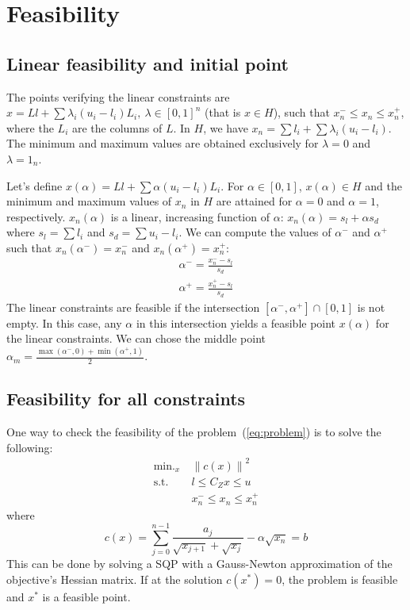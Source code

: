 \documentclass[]{article}
\DeclareMathOperator*{\minimize}{\min.}
\newcommand{\st}{\mbox{s.t.}}
\begin{document}
\section{Feasibility}
\subsection{Linear feasibility and initial point}
The points verifying the linear constraints are $x = Ll + \sum \lambda_i (u_i-l_i) L_i, \ \lambda \in \left[0,1\right]^n$ (that is $x \in H$), such that $x_n^- \leq x_n \leq x_n^+$, where the $L_i$ are the columns of $L$.\newline
In $H$, we have $x_n = \sum l_i + \sum \lambda_i (u_i-l_i)$. The minimum and maximum values are obtained exclusively for $\lambda = 0$ and $\lambda = 1_n$.

Let's define $x(\alpha) = Ll + \sum \alpha (u_i-l_i) L_i$. For $\alpha \in \left[0,1\right]$, $x(\alpha) \in H$ and the minimum and maximum values of $x_n$ in $H$ are attained for $\alpha = 0$ and $\alpha = 1$, respectively. $x_n(\alpha)$ is a linear, increasing function of $\alpha$: $x_n(\alpha) = s_l + \alpha s_d$ where $s_l = \sum l_i$ and $s_d = \sum u_i-l_i$. \newline
We can compute the values of $\alpha^-$ and $\alpha^+$ such that $x_n(\alpha^-) = x_n^-$ and $x_n(\alpha^+) = x_n^+$:
\begin{align}
 \alpha^- = \frac{x_n^- - s_l}{s_d} \\
 \alpha^+ = \frac{x_n^+ - s_l}{s_d}
\end{align}
The linear constraints are feasible if the intersection $\left[\alpha^-, \alpha^+\right] \cap \left[0,1\right]$ is not empty. In this case, any $\alpha$ in this intersection yields a feasible point $x(\alpha)$ for the linear constraints. We can chose the middle point $\alpha_m = \frac{\max(\alpha^-,0) + \min(\alpha^+,1)}{2}$.

\subsection{Feasibility for all constraints}
One way to check the feasibility of the problem~(\ref{eq:problem}) is to solve the following:
\begin{align}
  \minimize_x\ & \left\|c(x)\right\|^2 \\
  \st\ & l \leq C_Z x \leq u\\
       & x_n^- \leq x_n \leq x_n^+
\end{align}
where
\begin{equation}
  c(x) = \sum_{j=0}^{n-1} \frac{a_j}{\sqrt{x_{j+1}} + \sqrt{x_j}} - \alpha \sqrt{x_n} = b
\end{equation}
This can be done by solving a SQP with a Gauss-Newton approximation of the objective's Hessian matrix. If at the solution $c(x^*) = 0$, the problem is feasible and $x^*$ is a feasible point.
\end{document}

